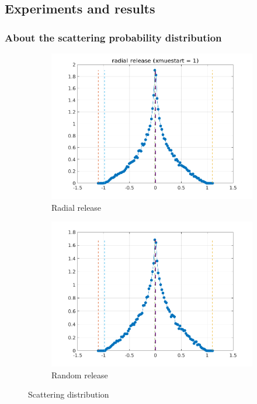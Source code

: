 \documentclass[../main/main.tex]{subfiles}
\begin{document}
\newpage
\subsection{Experiments and results}
\label{Dual_line_experiments_results}

\subsubsection{About the scattering probability distribution}
\begin{figure}[!htbp]
\hspace*{-0.5in}
\centering
\begin{subfigure}{.6\textwidth}
\includegraphics[width=1\textwidth]{../../two_resonance_lines/figures/scattering_distribution_radial_release.png}
\caption{Radial release}
\end{subfigure}%
\begin{subfigure}{.6\textwidth}
\includegraphics[width=1\textwidth]{../../two_resonance_lines/figures/scattering_distribution_random_release.png}
\caption{Random release}
\end{subfigure}
\caption{Scattering distribution}
\label{PCyg_mu_eq_1}
\end{figure}
\end{document}
